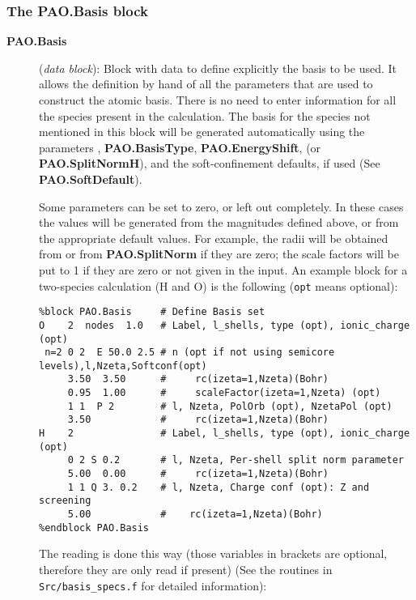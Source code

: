 \subsubsection{The PAO.Basis block}
\begin{description}

  \item[\textbf{PAO.Basis}] (\textit{data block}):
   Block with
  data to define explicitly the basis to be used.  It allows the
  definition by hand of all the parameters that are used to construct
  the atomic basis. There is no need to enter information for all the
  species present in the calculation. The basis for
  the species not mentioned in this block will be generated
  automatically using the parameters ,
  \textbf{PAO.BasisType}, \textbf{PAO.EnergyShift},
   (or \textbf{PAO.SplitNormH}), and the
  soft-confinement defaults, if used (See \textbf{PAO.SoftDefault}).

  Some parameters can be set to zero, or left out completely.  In
  these cases the values will be generated from the magnitudes defined
  above, or from the appropriate default values. For example, the
  radii will be obtained from
   or from \textbf{PAO.SplitNorm} if they are
  zero; the scale factors will be put to 1 if they are zero or not
  given in the input.  An example block for a two-species calculation
  (H and O) is the following (\texttt{opt} means optional):

\begin{verbatim}
%block PAO.Basis     # Define Basis set
O    2  nodes  1.0   # Label, l_shells, type (opt), ionic_charge (opt)
 n=2 0 2  E 50.0 2.5 # n (opt if not using semicore levels),l,Nzeta,Softconf(opt)
     3.50  3.50      #     rc(izeta=1,Nzeta)(Bohr)
     0.95  1.00      #     scaleFactor(izeta=1,Nzeta) (opt)
     1 1  P 2        # l, Nzeta, PolOrb (opt), NzetaPol (opt)
     3.50            #     rc(izeta=1,Nzeta)(Bohr)
H    2               # Label, l_shells, type (opt), ionic_charge (opt)
     0 2 S 0.2       # l, Nzeta, Per-shell split norm parameter
     5.00  0.00      #     rc(izeta=1,Nzeta)(Bohr)
     1 1 Q 3. 0.2    # l, Nzeta, Charge conf (opt): Z and screening
     5.00            #    rc(izeta=1,Nzeta)(Bohr)
%endblock PAO.Basis
\end{verbatim}

\noindent
The reading is done this way (those variables in brackets are
optional, therefore they are only read if present) (See
the routines in \texttt{Src/basis\_specs.f} for detailed information):


\end{description}
